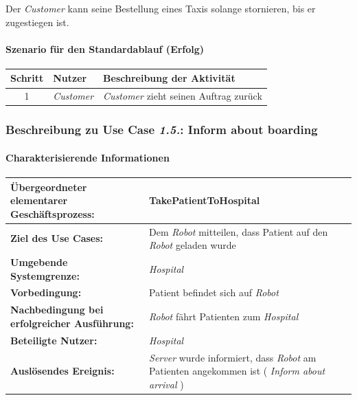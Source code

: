 				Der \emph{Customer} kann seine Bestellung eines Taxis solange stornieren, bis er zugestiegen ist.
				
				\paragraph*{Szenario für den Standardablauf (Erfolg)}
	
				\begin{table}[H]
					\centering
					\begin{tabularx}{\textwidth}{|c|p{2cm}|X|}
					\hline
					Schritt & Nutzer & Beschreibung der Aktivität \\ \hline
					1 & \emph{Customer} & \emph{Customer} zieht seinen Auftrag zurück \\
					\hline
					\end{tabularx}
				\end{table}
			
			\subsubsection{Beschreibung zu Use Case \emph{1.5.}: Inform about boarding}
				\paragraph*{Charakterisierende Informationen}
	
				\begin{table}[H]
					\centering
					\begin{tabularx}{\textwidth}{|p{5cm}|X|}
					\hline
					\textbf{Übergeordneter elementarer Geschäftsprozess:} & TakePatientToHospital   \\ \hline
					\textbf{Ziel des Use Cases:} & Dem \emph{Robot} mitteilen, dass Patient auf den \emph{Robot} geladen wurde \\ \hline
					\textbf{Umgebende Systemgrenze:} & \emph{Hospital} \\ \hline
					\textbf{Vorbedingung:} & Patient befindet sich auf \emph{Robot}\\ \hline
					\textbf{Nachbedingung bei erfolgreicher Ausführung:} & \emph{Robot} fährt Patienten zum \emph{Hospital} \\ \hline
					\textbf{Beteiligte Nutzer:} & \emph{Hospital}\\ \hline
					\textbf{Auslösendes Ereignis:} & \emph{Server} wurde informiert, dass \emph{Robot} am Patienten angekommen ist (\textit{ \glqq Inform about arrival \grqq }) \\
					\hline
					\end{tabularx}
				\end{table}
				
